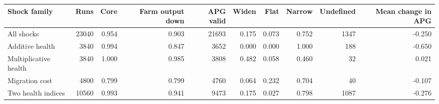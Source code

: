 \begin{tabular}{lrrrrrrrrr}
\hline
Shock family & Runs & Core & Farm output down & APG valid & Widen & Flat & Narrow & Undefined & Mean change in APG \\
\hline
All shocks & 23040 & 0.954 & 0.903 & 21693 & 0.175 & 0.073 & 0.752 & 1347 & -0.250 \\
Additive health & 3840 & 0.994 & 0.847 & 3652 & 0.000 & 0.000 & 1.000 & 188 & -0.650 \\
Multiplicative health & 3840 & 1.000 & 0.985 & 3808 & 0.482 & 0.058 & 0.460 & 32 & 0.021 \\
Migration cost & 4800 & 0.799 & 0.799 & 4760 & 0.064 & 0.232 & 0.704 & 40 & -0.107 \\
Two health indices & 10560 & 0.993 & 0.941 & 9473 & 0.175 & 0.027 & 0.798 & 1087 & -0.276 \\
\hline
\end{tabular}
